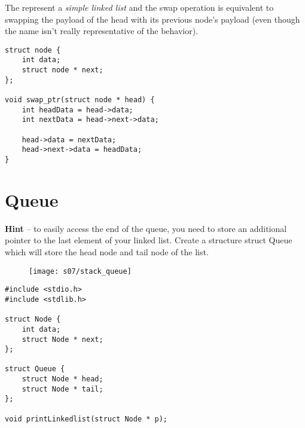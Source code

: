 The  represent a \emph{simple linked list} and the swap operation is equivalent to swapping the payload of the head with its previous node's payload (even though the name isn't really representative of the behavior).

\begin{lstlisting}
struct node {
    int data;
    struct node * next;
};

void swap_ptr(struct node * head) {
    int headData = head->data;
    int nextData = head->next->data;

    head->data = nextData;
    head->next->data = headData;
}
\end{lstlisting}

%
%
\section{Queue}


{\color{gray}\textbf{Hint} -- to easily access the end of the queue, you need to store
an additional pointer to the last element of your linked list. Create a
structure struct Queue which will store the head node and tail node of
the list.}


\begin{figure}[H]
    \center
    \texttt{[image: s07/stack\_queue]}
    \label{fig:stack_queue}
\end{figure}


\begin{lstlisting}
#include <stdio.h>
#include <stdlib.h>

struct Node {
    int data;
    struct Node * next;
};

struct Queue {
    struct Node * head;
    struct Node * tail;
};

void printLinkedlist(struct Node * p);
\end{lstlisting}

